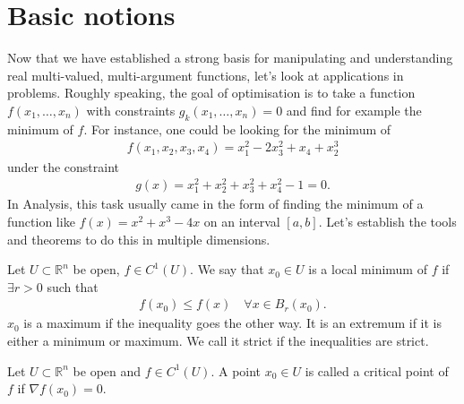\section{Basic notions}

Now that we have established a strong basis for manipulating and understanding real multi-valued, multi-argument functions, let's look at applications in problems. Roughly speaking, the goal of optimisation is to take a function $f(x_{1},\dots, x_{n})$ with constraints $g_{k}(x_{1}, \dots, x_{n}) = 0$ and find for example the minimum of $f$. For instance, one could be looking for the minimum of
\begin{align*}
	f(x_{1}, x_{2}, x_{3}, x_{4}) = x_{1}^{2} - 2 x_{3}^{2} + x_{4} + x_{2}^{3}
\end{align*}
under the constraint
\begin{align*}
	g(x) = x_{1}^{2} + x_{2}^{2} + x_{3}^{2} + x_{4}^{2} - 1 = 0.
\end{align*}
In Analysis, this task usually came in the form of finding the minimum of a function like $f(x) = x^{2} + x^{3} - 4x$ on an interval $[a,b]$. Let's establish the tools and theorems to do this in multiple dimensions.

\begin{definition}\label{def:local-extremum}
	Let $U \subset \mathbb{R}^{n}$ be open, $f \in C^{1}(U)$. We say that $x_{0} \in U$ is a local minimum of $f$ if $\exists r > 0$ such that
	\begin{align*}
		f(x_{0}) \leq f(x) \quad \forall x \in B_{r}(x_{0}).
	\end{align*}
	$x_{0}$ is a maximum if the inequality goes the other way. It is an extremum if it is either a minimum or maximum. We call it strict if the inequalities are strict.
\end{definition}

\begin{definition}\label{def:critical-point}
	Let $U \subset \mathbb{R}^{n}$ be open and $f \in C^{1}(U)$. A point $x_{0} \in U$ is called a critical point of $f$ if $\nabla f(x_{0}) = 0$.
\end{definition}


